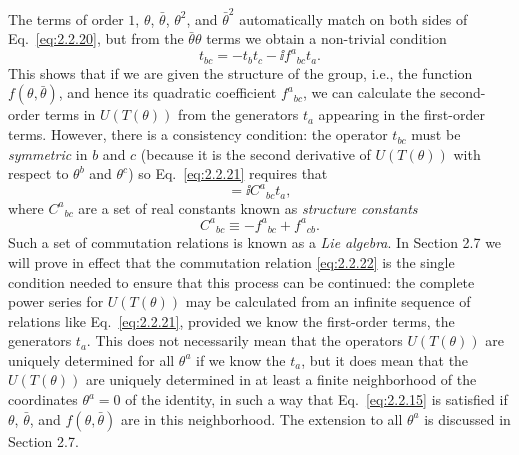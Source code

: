 The terms of order $1$, $\theta$, $\bar\theta$, $\theta^2$, and
$\bar\theta^2$ automatically match on both sides of Eq.~\eqref{eq:2.2.20}, but
from the $\bar\theta\theta$ terms we obtain a non-trivial condition
\begin{equation}
  t_{bc}=-t_b t_c-\ii f^a{}_{bc}t_a.
  \tag{2.2.21}\label{eq:2.2.21}
\end{equation}
This shows that if we are given the structure of the group, i.e., the
function $f(\theta,\bar\theta)$, and hence its quadratic coefficient
$f^a{}_{bc}$, we can calculate the second-order terms in $U(T(\theta))$
from the generators $t_a$ appearing in the first-order terms. However,
there is a consistency condition: the operator $t_{bc}$ must be
\emph{symmetric} in $b$ and $c$ (because it is the second derivative of
$U(T(\theta))$ with respect to $\theta^b$ and $\theta^c$) so Eq.~\eqref{eq:2.2.21}
requires that
\begin{equation}
  [t_b,t_c]=\ii C^a{}_{bc}t_a,
  \tag{2.2.22}\label{eq:2.2.22}
\end{equation}
where $C^a{}_{bc}$ are a set of real constants known as \emph{structure
constants}
\begin{equation}
  C^a{}_{bc}\equiv-f^a{}_{bc}+f^a{}_{cb}.
  \tag{2.2.23}\label{eq:2.2.23}
\end{equation}
Such a set of commutation relations is known as a \emph{Lie algebra}. In
Section 2.7 we will prove in effect that the commutation relation \eqref{eq:2.2.22}
is the single condition needed to ensure that this process can be
continued: the complete power series for $U(T(\theta))$ may be calculated
from an infinite sequence of relations like Eq.~\eqref{eq:2.2.21}, provided we know
the first-order terms, the generators $t_a$. This does not necessarily mean
that the operators $U(T(\theta))$ are uniquely determined for all
$\theta^a$ if we know the $t_a$, but it does mean that the $U(T(\theta))$
are uniquely determined in at least a finite neighborhood of the
coordinates $\theta^a=0$ of the identity, in such a way that Eq.~\eqref{eq:2.2.15}
is satisfied if $\theta$, $\bar\theta$, and $f(\theta,\bar\theta)$ are in
this neighborhood. The extension to all $\theta^a$ is discussed in
Section 2.7.

